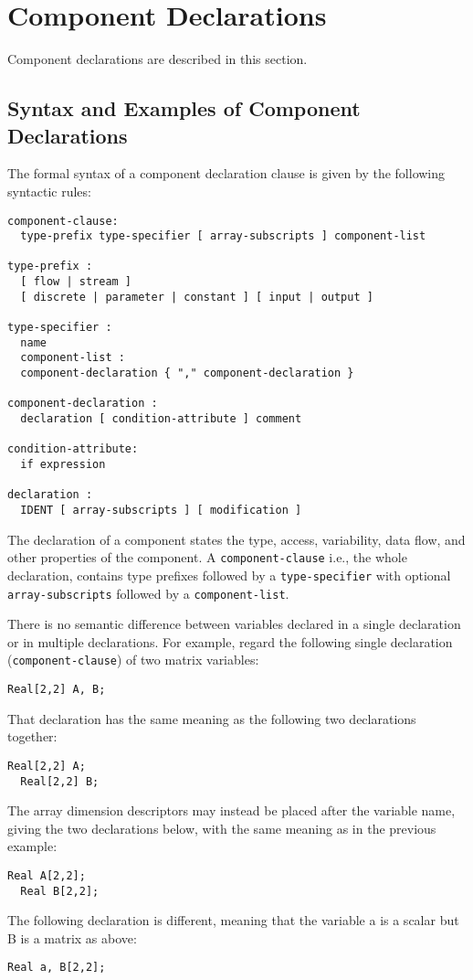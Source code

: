 \section{Component Declarations}

Component declarations are described in this section.

\subsection{Syntax and Examples of Component Declarations}

The formal syntax of a component declaration clause is given by the
following syntactic rules:

\begin{lstlisting}[language=grammar]
component-clause:
  type-prefix type-specifier [ array-subscripts ] component-list

type-prefix :
  [ flow | stream ]
  [ discrete | parameter | constant ] [ input | output ]

type-specifier :
  name
  component-list :
  component-declaration { "," component-declaration }

component-declaration :
  declaration [ condition-attribute ] comment

condition-attribute:
  if expression

declaration :
  IDENT [ array-subscripts ] [ modification ]
\end{lstlisting}

\begin{nonnormative}
The declaration of a component states the type, access,
variability, data flow, and other properties of the component. A
\lstinline!component-clause! i.e., the whole declaration, contains type
prefixes followed by a \lstinline!type-specifier! with optional
\lstinline!array-subscripts! followed by a \lstinline!component-list!.

There is no semantic difference between variables declared in a
single declaration or in multiple declarations. For example, regard the
following single declaration (\lstinline!component-clause!) of two matrix
variables:
\begin{lstlisting}[language=modelica]
  Real[2,2] A, B;
\end{lstlisting}
That declaration has the same meaning as the following two
declarations together:
\begin{lstlisting}[language=modelica]
  Real[2,2] A;
  Real[2,2] B;
\end{lstlisting}
The array dimension descriptors may instead be placed after the
variable name, giving the two declarations below, with the same meaning
as in the previous example:
\begin{lstlisting}[language=modelica]
  Real A[2,2];
  Real B[2,2];
\end{lstlisting}
The following declaration is different, meaning that the variable
a is a scalar but B is a matrix as above:
\begin{lstlisting}[language=modelica]
  Real a, B[2,2];
\end{lstlisting}
\end{nonnormative}

